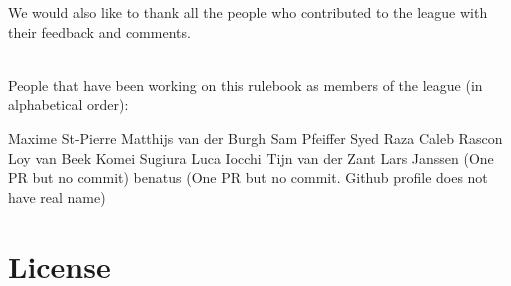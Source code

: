 We would also like to thank all the people who contributed to the \AtHome{} league with their feedback and comments.

~\\\noindent People that have been working on this rulebook as members of the league (in alphabetical order):
\begin{center}
	\begin{minipage}{0.8\textwidth}
		\begin{multicols}{3}%
			\footnotesize
			\noindent%
			
Maxime St-Pierre
Matthijs van der Burgh
Sam Pfeiffer
Syed Raza
Caleb Rascon
Loy van Beek
Komei Sugiura
Luca Iocchi
Tijn van der Zant
			Lars Janssen (One PR but no commit)
			benatus (One PR but no commit. Github profile does not have real name)
			
		\end{multicols}
	\end{minipage}
\end{center}

\section*{License}

\doclicenseThis


